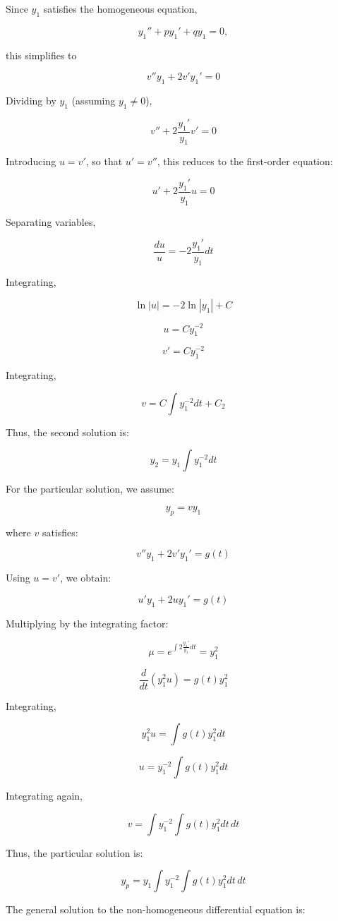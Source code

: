 \documentclass[12pt]{article}
\begin{document}
\begin{enumerate}
\begin{enumerate}
Since \( y_1 \) satisfies the homogeneous equation,

\[
y_1'' + p y_1' + q y_1 = 0,
\]

this simplifies to

\[
v'' y_1 + 2 v' y_1' = 0
\]

Dividing by \( y_1 \) (assuming \( y_1 \neq 0 \)),

\[
v'' + 2 \frac{y_1'}{y_1} v' = 0
\]

Introducing \( u = v' \), so that \( u' = v'' \), this reduces to the first-order equation:

\[
u' + 2 \frac{y_1'}{y_1} u = 0
\]

Separating variables,

\[
\frac{du}{u} = -2 \frac{y_1'}{y_1} dt
\]

Integrating,

\[
\ln |u| = -2 \ln |y_1| + C
\]

\[
u = C y_1^{-2}
\]

\[
v' = C y_1^{-2}
\]

Integrating,

\[
v = C \int y_1^{-2} dt + C_2
\]

Thus, the second solution is:

\[
y_2 = y_1 \int y_1^{-2} dt
\]

For the particular solution, we assume:

\[
y_p = v y_1
\]

where \( v \) satisfies:

\[
v'' y_1 + 2 v' y_1' = g(t)
\]

Using \( u = v' \), we obtain:

\[
u' y_1 + 2 u y_1' = g(t)
\]

Multiplying by the integrating factor:

\[
\mu = e^{\int 2 \frac{y_1'}{y_1} dt} = y_1^2
\]

\[
\frac{d}{dt} (y_1^2 u) = g(t) y_1^2
\]

Integrating,

\[
y_1^2 u = \int g(t) y_1^2 dt
\]

\[
u = y_1^{-2} \int g(t) y_1^2 dt
\]

Integrating again,

\[
v = \int y_1^{-2} \int g(t) y_1^2 dt \, dt
\]

Thus, the particular solution is:

\[
y_p = y_1 \int y_1^{-2} \int g(t) y_1^2 dt \, dt
\]

The general solution to the non-homogeneous differential equation is:


\end{enumerate}
\end{enumerate}
\end{document}

